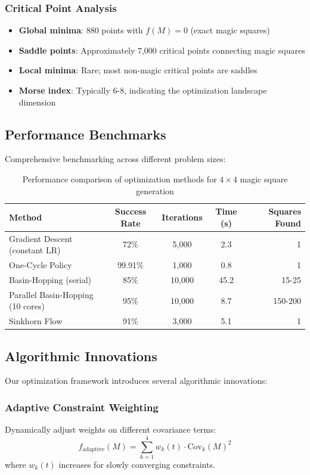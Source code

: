 \subsubsection{Critical Point Analysis}
\begin{itemize}
    \item \textbf{Global minima}: 880 points with $f(M) = 0$ (exact magic squares)
    \item \textbf{Saddle points}: Approximately 7,000 critical points connecting magic squares
    \item \textbf{Local minima}: Rare; most non-magic critical points are saddles
    \item \textbf{Morse index}: Typically 6-8, indicating the optimization landscape dimension
\end{itemize}

\subsection{Performance Benchmarks}

Comprehensive benchmarking across different problem sizes:

\begin{table}[h]
\centering
\begin{tabular}{lcccr}
\toprule
Method & Success Rate & Iterations & Time (s) & Squares Found \\
\midrule
Gradient Descent (constant LR) & 72\% & 5,000 & 2.3 & 1 \\
One-Cycle Policy & 99.91\% & 1,000 & 0.8 & 1 \\
Basin-Hopping (serial) & 85\% & 10,000 & 45.2 & 15-25 \\
Parallel Basin-Hopping (10 cores) & 95\% & 10,000 & 8.7 & 150-200 \\
Sinkhorn Flow & 91\% & 3,000 & 5.1 & 1 \\
\bottomrule
\end{tabular}
\caption{Performance comparison of optimization methods for $4 \times 4$ magic square generation}
\label{tab:optimization-performance}
\end{table}

\subsection{Algorithmic Innovations}

Our optimization framework introduces several algorithmic innovations:

\subsubsection{Adaptive Constraint Weighting}
Dynamically adjust weights on different covariance terms:
\begin{equation}
f_{\text{adaptive}}(M) = \sum_{k=1}^4 w_k(t) \cdot \text{Cov}_k(M)^2
\end{equation}
where $w_k(t)$ increases for slowly converging constraints.

